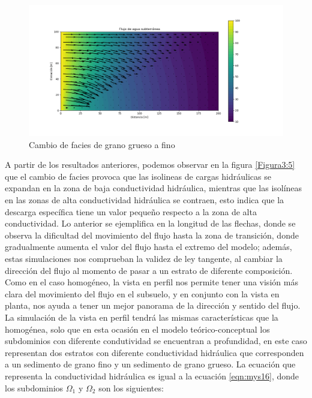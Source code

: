  \begin{figure}[H]
\centering
\includegraphics[scale=0.55]{Figura_32.png}
\caption{ Cambio de facies de grano grueso a fino}
\label{Figura3:6}
\end{figure}

A partir de los resultados anteriores, podemos observar en la figura \ref{Figura3:5} que el cambio de facies provoca que las isolineas de cargas hidráulicas se expandan en la zona de baja conductividad hidráulica, mientras que las isolíneas en las zonas de alta conductividad hidráulica se contraen, esto indica que la descarga específica tiene un  valor pequeño respecto a la zona de alta conductividad. Lo anterior se ejemplifica en la longitud de las flechas, donde se observa la dificultad del movimiento del flujo hasta la zona de transición, donde gradualmente aumenta el valor del flujo hasta el extremo del modelo; además, estas simulaciones nos comprueban la validez de ley tangente, al cambiar la dirección del flujo al momento de pasar a un estrato de diferente composición.
\\

Como en el caso homogéneo, la vista en perfil nos permite tener una visión más clara del movimiento del flujo  en el subsuelo, y en conjunto con la vista en planta, nos ayuda a tener un mejor panorama de la dirección y sentido del flujo. La simulación de la vista en perfil tendrá las mismas características que la homogénea, solo que en esta ocasión en el modelo teórico-conceptual los subdominios con diferente condutividad se encuentran a profundidad, en este caso representan dos estratos con diferente conductividad hidráulica que corresponden a un sedimento de grano fino y un sedimento de grano grueso. La ecuación que representa la conductividad hidráulica es igual a la ecuación \ref{eqn:mys16}, donde los subdominios ${\Omega}_{1}$ y ${\Omega}_{2}$ son los siguientes:

